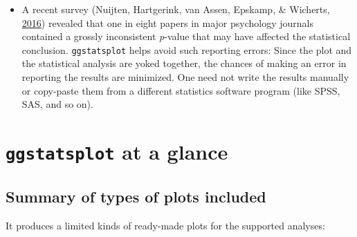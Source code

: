 \documentclass[]{article}
\providecommand{\tightlist}{%
  \setlength{\itemsep}{0pt}\setlength{\parskip}{0pt}}
\begin{document}
\begin{itemize}
\tightlist
\item
  A recent survey (Nuijten, Hartgerink, van Assen, Epskamp, \& Wicherts, \protect\hyperlink{ref-nuijtenPrevalenceStatisticalReporting2016}{2016}) revealed that
  one in eight papers in major psychology journals contained a grossly
  inconsistent \emph{p}-value that may have affected the statistical conclusion.
  \texttt{ggstatsplot} helps avoid such reporting errors: Since the plot and the
  statistical analysis are yoked together, the chances of making an error in
  reporting the results are minimized. One need not write the results manually
  or copy-paste them from a different statistics software program (like SPSS,
  SAS, and so on).
\end{itemize}

\hypertarget{ggstatsplot-at-a-glance}{%
\section{\texorpdfstring{\texttt{ggstatsplot} at a glance}{ggstatsplot at a glance}}\label{ggstatsplot-at-a-glance}}

\hypertarget{summary-of-types-of-plots-included}{%
\subsection{Summary of types of plots included}\label{summary-of-types-of-plots-included}}

It produces a limited kinds of ready-made plots for the supported analyses:
\end{document}
